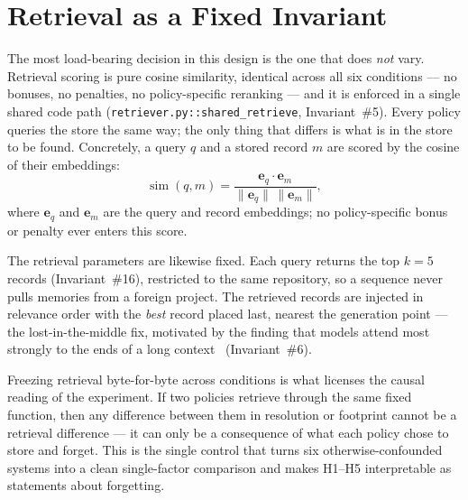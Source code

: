 

\section{Retrieval as a Fixed Invariant}

The most load-bearing decision in this design is the one that does \emph{not} vary.
Retrieval scoring is pure cosine similarity, identical across all six conditions --- no
bonuses, no penalties, no policy-specific reranking --- and it is enforced in a single
shared code path (\texttt{retriever.py::shared\_retrieve}, Invariant~\#5). Every policy
queries the store the same way; the only thing that differs is what is in the store to be
found. Concretely, a query $q$ and a stored record $m$ are scored by the cosine of their
embeddings:
\begin{equation}
  \label{eq:cosine}
  \operatorname{sim}(q, m) = \frac{\mathbf{e}_q \cdot \mathbf{e}_m}
                                  {\lVert \mathbf{e}_q \rVert \, \lVert \mathbf{e}_m \rVert},
\end{equation}
where $\mathbf{e}_q$ and $\mathbf{e}_m$ are the query and record embeddings; no
policy-specific bonus or penalty ever enters this score.

The retrieval parameters are likewise fixed. Each query returns the top $k=5$ records
(Invariant~\#16), restricted to the same repository, so a sequence never pulls memories from
a foreign project. The retrieved records are injected in relevance order with the
\emph{best} record placed last, nearest the generation point --- the lost-in-the-middle fix,
motivated by the finding that models attend most strongly to the ends of a long
context~\cite{liu2024} (Invariant~\#6).

Freezing retrieval byte-for-byte across conditions is what licenses the causal reading of
the experiment. If two policies retrieve through the same fixed function, then any
difference between them in resolution or footprint cannot be a retrieval difference --- it
can only be a consequence of what each policy chose to store and forget. This is the single
control that turns six otherwise-confounded systems into a clean single-factor comparison
and makes H1--H5 interpretable as statements about forgetting.
